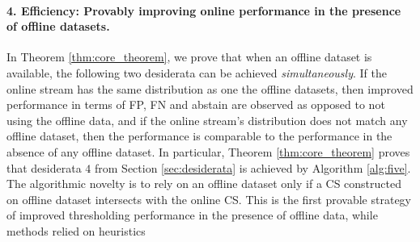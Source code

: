 \paragraph{4. Efficiency: Provably improving online performance in the presence of offline datasets.} 
In Theorem \ref{thm:core_theorem}, we prove that when an offline dataset is available, the following two desiderata can be achieved \emph{simultaneously}. If the online stream has the same distribution as one the offline datasets, then improved performance in terms of FP, FN and abstain are observed as opposed to not using the offline data, and if the online stream's distribution does not match any offline dataset, then the performance is comparable to the performance in the absence of any offline dataset. In particular, Theorem \ref{thm:core_theorem} proves that desiderata $4$ from Section \ref{sec:desiderata} is achieved by Algorithm \ref{alg:five}. The algorithmic novelty is to rely on an offline dataset only if a CS constructed on offline dataset intersects with the online CS. This is the first provable strategy of improved thresholding performance in the presence of offline data, while methods relied on heuristics \cite{audibert2020usad, bhatia2022memstream, huang2022semi} 
